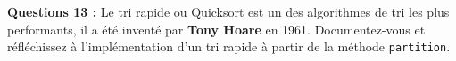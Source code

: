 \documentclass[iutinfo,a4paper,10pt]{ustl-tdtp}
\begin{document}
\textbf{Questions 13 : }\newline
Le tri rapide ou Quicksort est un des algorithmes de tri les plus performants, il a été inventé par \textbf{Tony Hoare} en 1961. Documentez-vous et réfléchissez à l'implémentation d'un tri rapide à partir de la méthode \texttt{partition}.

%
%


%
\end{document}
